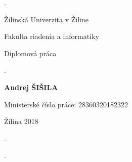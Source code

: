 \begin{titlepage}

\phantom.

\bigskip

\begin{center}
{\sc\LARGE Žilinská Univerzita v Žiline}
\medskip

{\sc\Large Fakulta riadenia a informatiky}

\vfill\vfill\vfill\vfill

{\sc\LARGE Diplomová práca}

\medskip

{\large\bf \nazovpraceSK}

\end{center}


\vfill\vfill\vfill\vfill


\phantom.\hfill
\begin{center}
{\large\bf Andrej ŠIŠILA}

\medskip

\medskip



\medskip
\bigskip

\medskip

Ministerské číslo práce: 28360320182322

\medskip

Žilina 2018

\end{center}
\hspace{1.7cm}\phantom.

\vspace{2.9cm}

\phantom.
\end{titlepage}



